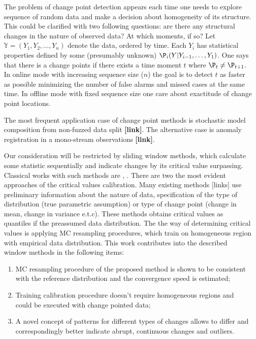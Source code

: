 

The problem of change point detection appears each time one needs to explore sequence of random data and make a decision about homogeneity of its structure. This could be clarified with two following questions: are there  any structural changes in the nature of observed data? At which moments, if so? Let  $\mathbb{Y} = (Y_1, Y_2,\ldots, Y_n)$ denote the data, ordered by time. Each $Y_i$ has statistical properties defined by some (presumably unknown) $\P_i(Y | Y_{i-1},\ldots,Y_1)$. One says that there is a change points if there exists a time moment $t$ where $\P_t \neq \P_{t+1}$. In online mode with increasing sequence size ($n$) the goal is to detect $t$ as faster as possible minimizing the number of false alarms and missed cases at the same time. In offline mode with fixed sequence size one care about exactitude of change point locations. 

The most frequent application case of change point methods is stochastic model composition from non-fuzzed data split \textbf{[link]}. The alternative case is anomaly registration in a mono-stream observations \textbf{[link]}.    


Our consideration will be restricted by sliding window methods, which calculate some statistic sequentially  and  indicate changes by its critical value surpassing. 
Classical works with such methods are \cite{wm1}, \cite{wm2}.      
There are two the most evident approaches of the critical values calibration. Many existing methods [links] use preliminary information about the nature of data, specification of the type of distribution (true parametric assumption)  or type of change point (change in mean, change in variance e.t.c). These methods obtains critical values as quantiles if the preassumed data distribution. The the way of determining critical values is applying MC resampling procedures, which train on homogeneous region with empirical data distribution.    
This work  contributes into the described window methods in the following items:
\begin{enumerate}
\item MC resampling procedure of the proposed method is shown to be consistent with the reference distribution and the convergence speed is estimated;
\item Training calibration procedure doesn't require  homogeneous regions and could be executed with change pointed data;
\item A novel concept of patterns for different types of changes allows to differ  and correspondingly better indicate abrupt, continuous changes and outliers.    
\end{enumerate}

